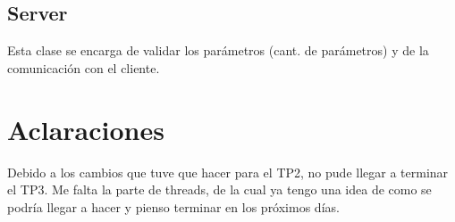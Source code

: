 \documentclass[titlepage,a4paper]{article}
\begin{document}
\subsection{Server}

Esta clase se encarga de validar los parámetros (cant. de parámetros) y de la comunicación con el cliente.

\section{Aclaraciones}

Debido a los cambios que tuve que hacer para el TP2, no pude llegar a terminar el TP3. Me falta la parte de threads, de la cual ya tengo una idea de como se podría llegar a hacer y pienso terminar en los próximos días.
\end{document}
